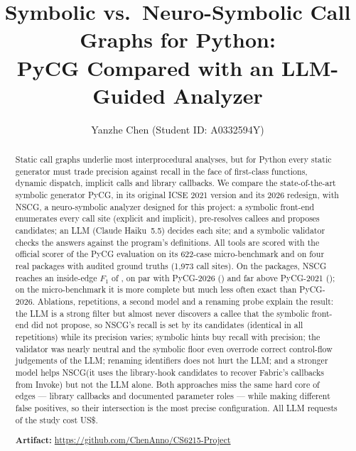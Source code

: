 \documentclass[sigconf]{acmart}
\newcommand{\nscg}{NSCG\xspace}
\newcommand{\repo}{\url{https://github.com/ChenAnno/CS6215-Project}}
\begin{document}
\title{Symbolic vs.\ Neuro-Symbolic Call Graphs for Python:\\
PyCG Compared with an LLM-Guided Analyzer}

\author{Yanzhe Chen (Student ID: A0332594Y)}

\begin{abstract}
Static call graphs underlie most interprocedural analyses, but for Python every
static generator must trade precision against recall in the face of
first-class functions, dynamic dispatch, implicit calls and library callbacks. We
compare the state-of-the-art symbolic generator PyCG, in its original ICSE 2021
version and its 2026 redesign, with \nscg, a neuro-symbolic analyzer designed
for this project: a symbolic front-end enumerates every call site (explicit and
implicit), pre-resolves callees and proposes candidates; an LLM (Claude
Haiku~5.5) decides each site; and a symbolic validator checks the answers
against the program's definitions. All tools are scored with the official
scorer of the PyCG evaluation on its 622-case micro-benchmark and on four real
packages with audited ground truths (1,973 call sites). On the packages, \nscg
reaches an inside-edge $F_1$ of , on par with PyCG-2026
() and far above PyCG-2021 ();
on the micro-benchmark it is more complete but much less often exact than
PyCG-2026. Ablations, repetitions, a second model and a renaming probe explain
the result: the LLM is a strong filter but almost never discovers a callee that
the symbolic front-end did not propose, so \nscg's recall is set by its
candidates (identical in all repetitions) while its precision varies; symbolic
hints buy recall with precision; the validator was nearly neutral and the
symbolic floor even overrode correct control-flow judgements of the LLM; renaming
identifiers does not hurt the LLM; and a stronger model helps \nscg (it uses the
library-hook candidates to recover Fabric's callbacks from Invoke) but not the
LLM alone. Both approaches miss the same hard core of edges --- library
callbacks and documented parameter roles --- while making different false
positives, so their intersection is the most precise configuration. All LLM
requests of the study cost US\$.

\smallskip\noindent\textbf{Artifact:} \repo
\end{abstract}


\maketitle
\renewcommand{\shortauthors}{Yanzhe Chen}










\end{document}
